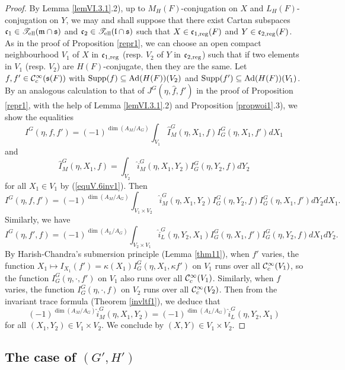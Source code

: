 \documentclass[a4paper]{amsart}
\newcommand{\fm}{{\mathfrak{m}}} \newcommand{\fn}{{\mathfrak{n}}}\newcommand{\fo}{{\mathfrak{o}}} \newcommand{\fp}{{\mathfrak{p}}}
\theoremstyle{definition}
\theoremstyle{remark}
\numberwithin{equation}{subsection}
\begin{document}
\begin{proof}
By Lemma \ref{lemVI.3.1}.2), up to $M_H(F)$-conjugation on $X$ and $L_H(F)$-conjugation on $Y$, we may and shall suppose that there exist Cartan subspaces $\fc_1\in\mst_\el(\fm\cap\fs)$ and ${\mathfrak{c}}_2\in\mathscr{T}_{\mathrm{ell}}({\mathfrak{l}}\cap{\mathfrak{s}})$ such that $X\in{\mathfrak{c}}_{1, {\mathrm{reg}}}(F)$ and $Y\in{\mathfrak{c}}_{2, {\mathrm{reg}}}(F)$. As in the proof of Proposition \ref{repr1}, we can choose an open compact neighbourhood $V_1$ of $X$ in ${\mathfrak{c}}_{1, {\mathrm{reg}}}$ (resp. $V_2$ of $Y$ in ${\mathfrak{c}}_{2, {\mathrm{reg}}}$) such that if two elements in $V_1$ (resp. $V_2$) are $H(F)$-conjugate, then they are the same. Let $f, f'\in{\mathcal {C}}_c^\infty({\mathfrak{s}}(F))$ with ${\mathrm{Supp}}(f)\subseteq {\mathrm{Ad}}(H(F))(V_2)$ and ${\mathrm{Supp}}(f')\subseteq {\mathrm{Ad}}(H(F))(V_1)$. By an analogous calculation to that of $J^G(\eta, \hat{f}, f')$ in the proof of Proposition \ref{repr1}, with the help of Lemma \ref{lemVI.3.1}.2) and Proposition \ref{propwoi1}.3), we show the equalities
$$ I^G(\eta, f, f')=(-1)^{\dim(A_M/A_G)}\int_{V_1} \hat{I}_M^G(\eta, X_1, f) I_G^G(\eta, X_1, f') dX_1 $$
and
$$ \hat{I}_M^G(\eta, X_1, f)=\int_{V_2} \hat{i}_M^G(\eta, X_1, Y_2) I_G^G(\eta, Y_2, f) dY_2 $$
for all $X_1\in V_1$ by (\ref{equV.6inv1}). Then
$$ I^G(\eta, f, f')=(-1)^{\dim(A_M/A_G)}\int_{V_1\times V_2} \hat{i}_M^G(\eta, X_1, Y_2) I_G^G(\eta, Y_2, f) I_G^G(\eta, X_1, f') dY_2 dX_1. $$
Similarly, we have
$$ I^G(\eta, f', f)=(-1)^{\dim(A_L/A_G)}\int_{V_2\times V_1} \hat{i}_L^G(\eta, Y_2, X_1) I_G^G(\eta, X_1, f') I_G^G(\eta, Y_2, f) dX_1 dY_2. $$
By Harish-Chandra's submersion principle (Lemma \ref{thm11}), when $f'$ varies, the function $X_1\mapsto I_{X_1}(f')=\kappa(X_1) I_G^G(\eta, X_1, \kappa f')$ on $V_1$ runs over all ${\mathcal {C}}_c^\infty(V_1)$, so the function $I_G^G(\eta, \cdot, f')$ on $V_1$ also runs over all ${\mathcal {C}}_c^\infty(V_1)$. Similarly, when $f$ varies, the function $I_G^G(\eta, \cdot, f)$ on $V_2$ runs over all ${\mathcal {C}}_c^\infty(V_2)$. Then from the invariant trace formula (Theorem \ref{invltf1}), we deduce that
$$ (-1)^{\dim(A_M/A_G)} \hat{i}_M^G(\eta, X_1, Y_2)=(-1)^{\dim(A_L/A_G)} \hat{i}_L^G(\eta, Y_2, X_1) $$
for all $(X_1, Y_2)\in V_1\times V_2$. We conclude by $(X, Y)\in V_1\times V_2$. 
\end{proof}

\subsection{The case of $(G',H')$}
\end{document}
